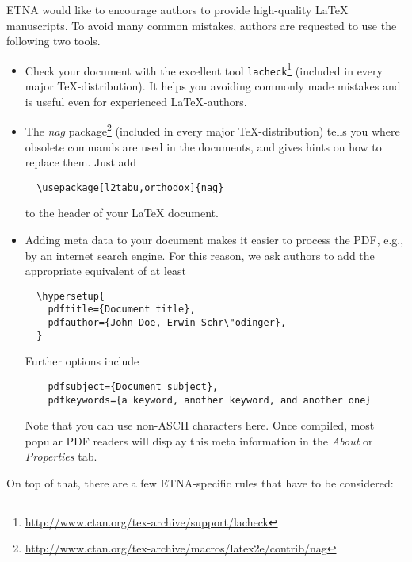 \documentclass[parskip=half]{scrartcl}
\begin{document}
ETNA would like to encourage authors to provide high-quality \LaTeX{}
manuscripts. To avoid many common mistakes, authors are requested to use the
following two tools.
\begin{itemize}
\item Check your document with the excellent tool
  \verb|lacheck|\footnote{\url{http://www.ctan.org/tex-archive/support/lacheck}}
  (included in every major \TeX{}-dis\-tri\-bu\-tion). It helps you avoiding commonly
  made mistakes and is useful even for experienced \LaTeX{}-authors.

\item The \emph{nag}
  package\footnote{\url{http://www.ctan.org/tex-archive/macros/latex2e/contrib/nag}}
  (included in every major \TeX-distribution) tells you where obsolete commands
  are used in the documents, and gives hints on how to replace them. Just add
  \begin{verbatim}
  \usepackage[l2tabu,orthodox]{nag}
  \end{verbatim}
  to the header of your \LaTeX{} document.

\item Adding meta data to your document makes it easier to process the
  PDF, e.g., by an internet search engine. For this reason, we ask authors to
  add the appropriate equivalent of at least
  \begin{verbatim}
  \hypersetup{
    pdftitle={Document title},
    pdfauthor={John Doe, Erwin Schr\"odinger},
  }
  \end{verbatim}
  Further options include
  \begin{verbatim}
    pdfsubject={Document subject},
    pdfkeywords={a keyword, another keyword, and another one}
  \end{verbatim}
  Note that you can use non-ASCII characters here.
  Once compiled, most popular PDF readers will display this meta information in
  the \emph{About} or \emph{Properties} tab.
\end{itemize}

On top of that, there are a few ETNA-specific rules that have to be considered:
\end{document}
